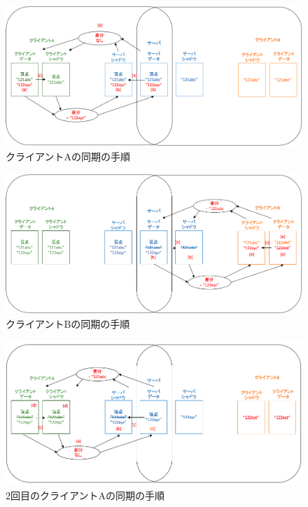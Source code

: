 \begin{figure}[]
  \begin{center}
    \includegraphics[scale=0.45]{images/sycle1}
    \caption{クライアントAの同期の手順}
    \label{sycle1}
  \end{center}
\end{figure}
\begin{figure}[]
  \begin{center}
    \includegraphics[scale=0.45]{images/sycle2}
    \caption{クライアントBの同期の手順}
    \label{sycle2}
  \end{center}
\end{figure}
\begin{figure}[]
  \begin{center}
    \includegraphics[scale=0.5]{images/sycle3}
    \caption{2回目のクライアントAの同期の手順}
    \label{sycle3}
  \end{center}
\end{figure}
